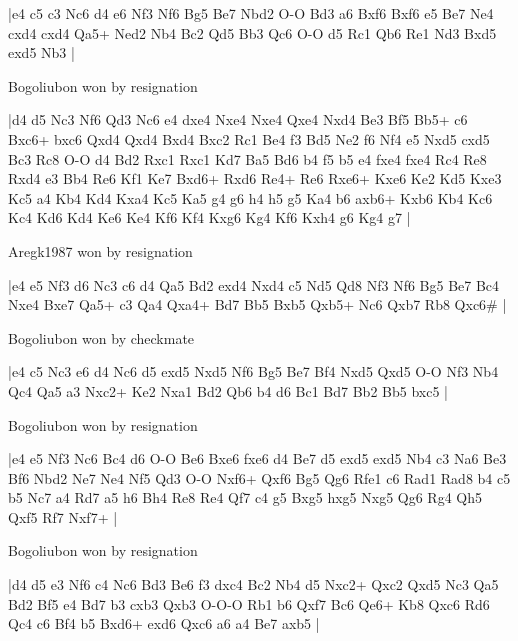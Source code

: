 \makegametitle
|e4 c5 c3 Nc6 d4 e6 Nf3 Nf6 Bg5 Be7 Nbd2 O-O Bd3 a6 Bxf6 Bxf6 e5 Be7 Ne4 cxd4 cxd4 Qa5+ Ned2 Nb4 Bc2 Qd5 Bb3 Qc6 O-O d5 Rc1 Qb6 Re1 Nd3 Bxd5 exd5 Nb3  |

\showboard

Bogoliubon won by resignation

\makegametitle
|d4 d5 Nc3 Nf6 Qd3 Nc6 e4 dxe4 Nxe4 Nxe4 Qxe4 Nxd4 Be3 Bf5 Bb5+ c6 Bxc6+ bxc6 Qxd4 Qxd4 Bxd4 Bxc2 Rc1 Be4 f3 Bd5 Ne2 f6 Nf4 e5 Nxd5 cxd5 Bc3 Rc8 O-O d4 Bd2 Rxc1 Rxc1 Kd7 Ba5 Bd6 b4 f5 b5 e4 fxe4 fxe4 Rc4 Re8 Rxd4 e3 Bb4 Re6 Kf1 Ke7 Bxd6+ Rxd6 Re4+ Re6 Rxe6+ Kxe6 Ke2 Kd5 Kxe3 Kc5 a4 Kb4 Kd4 Kxa4 Kc5 Ka5 g4 g6 h4 h5 g5 Ka4 b6 axb6+ Kxb6 Kb4 Kc6 Kc4 Kd6 Kd4 Ke6 Ke4 Kf6 Kf4 Kxg6 Kg4 Kf6 Kxh4 g6 Kg4 g7  |

\showboard

Aregk1987 won by resignation

\makegametitle
|e4 e5 Nf3 d6 Nc3 c6 d4 Qa5 Bd2 exd4 Nxd4 c5 Nd5 Qd8 Nf3 Nf6 Bg5 Be7 Bc4 Nxe4 Bxe7 Qa5+ c3 Qa4 Qxa4+ Bd7 Bb5 Bxb5 Qxb5+ Nc6 Qxb7 Rb8 Qxc6\#  |

\showboard

Bogoliubon won by checkmate

\makegametitle
|e4 c5 Nc3 e6 d4 Nc6 d5 exd5 Nxd5 Nf6 Bg5 Be7 Bf4 Nxd5 Qxd5 O-O Nf3 Nb4 Qc4 Qa5 a3 Nxc2+ Ke2 Nxa1 Bd2 Qb6 b4 d6 Bc1 Bd7 Bb2 Bb5 bxc5  |

\showboard

Bogoliubon won by resignation

\makegametitle
|e4 e5 Nf3 Nc6 Bc4 d6 O-O Be6 Bxe6 fxe6 d4 Be7 d5 exd5 exd5 Nb4 c3 Na6 Be3 Bf6 Nbd2 Ne7 Ne4 Nf5 Qd3 O-O Nxf6+ Qxf6 Bg5 Qg6 Rfe1 c6 Rad1 Rad8 b4 c5 b5 Nc7 a4 Rd7 a5 h6 Bh4 Re8 Re4 Qf7 c4 g5 Bxg5 hxg5 Nxg5 Qg6 Rg4 Qh5 Qxf5 Rf7 Nxf7+  |

\showboard

Bogoliubon won by resignation

\makegametitle
|d4 d5 e3 Nf6 c4 Nc6 Bd3 Be6 f3 dxc4 Bc2 Nb4 d5 Nxc2+ Qxc2 Qxd5 Nc3 Qa5 Bd2 Bf5 e4 Bd7 b3 cxb3 Qxb3 O-O-O Rb1 b6 Qxf7 Bc6 Qe6+ Kb8 Qxc6 Rd6 Qc4 c6 Bf4 b5 Bxd6+ exd6 Qxc6 a6 a4 Be7 axb5  |

